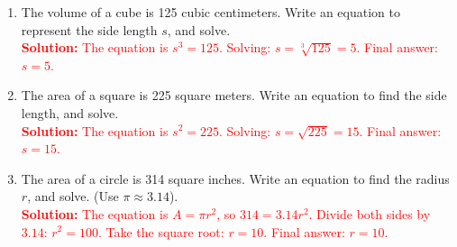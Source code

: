 \documentclass[10pt]{article}
\begin{document}
\begin{tcolorbox}[colframe=black!60, colback=white, 
coltitle=black, colbacktitle=black!15, fonttitle=\bfseries\Large, 
title=Problems, halign title=center, left=10pt, right=10pt, top=10pt, bottom=60pt]
\begin{enumerate}[itemsep=3em]
    \item The volume of a cube is 125 cubic centimeters. Write an equation to represent the side length \(s\), and solve.\\
    \textcolor{red}{\textbf{Solution:} The equation is \(s^3 = 125\). Solving: \(s = \sqrt[3]{125} = 5\). Final answer: \(s = 5\).}

    \item The area of a square is 225 square meters. Write an equation to find the side length, and solve.\\
    \textcolor{red}{\textbf{Solution:} The equation is \(s^2 = 225\). Solving: \(s = \sqrt{225} = 15\). Final answer: \(s = 15\).}

    \item The area of a circle is 314 square inches. Write an equation to find the radius \(r\), and solve. (Use \(\pi \approx 3.14\)).\\
    \textcolor{red}{\textbf{Solution:} The equation is \(A = \pi r^2\), so \(314 = 3.14r^2\). Divide both sides by \(3.14\): \(r^2 = 100\). Take the square root: \(r = 10\). Final answer: \(r = 10\).}
\end{enumerate}
\end{tcolorbox}

\vspace{1em}
\end{document}
